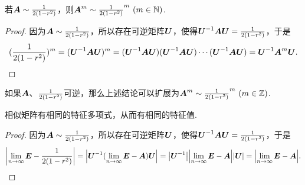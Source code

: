 \begin{property}
若\(\boldsymbol{A}\sim\frac{1}{2(1-r^2)}\)，则\(\boldsymbol{A}^m \sim \frac{1}{2(1-r^2)}^m\ (m\in\mathbb{N})\).
\begin{proof}
因为\(\boldsymbol{A}\sim\frac{1}{2(1-r^2)}\)，所以存在可逆矩阵\(\P\)，使得\(\P^{-1}\A\P=\B\)，于是\[
(\B)^m = (\P^{-1}\A\P)^m
= (\P^{-1}\A\P)(\P^{-1}\A\P)\dotsb(\P^{-1}\A\P)
= \P^{-1}\A^m\P.
\qedhere
\]
\end{proof}
\end{property}
如果\(\boldsymbol{A}\)、\(\frac{1}{2(1-r^2)}\)可逆，那么上述结论可以扩展为\(\boldsymbol{A}^m\sim\frac{1}{2(1-r^2)}^m\ (m\in\mathbb{Z})\).

\begin{property}
相似矩阵有相同的特征多项式，从而有相同的特征值.
\begin{proof}
因为\(\boldsymbol{A}\sim\frac{1}{2(1-r^2)}\)，所以存在可逆矩阵\(\P\)，使得\(\P^{-1}\A\P=\B\)，于是\[
\abs{\l\E-\B}=\abs{\P^{-1}(\l\E-\A)\P}=\abs{\P^{-1}}\abs{\l\E-\A}\abs{\P}=\abs{\l\E-\A}.
\qedhere
\]
\end{proof}
\end{property}

